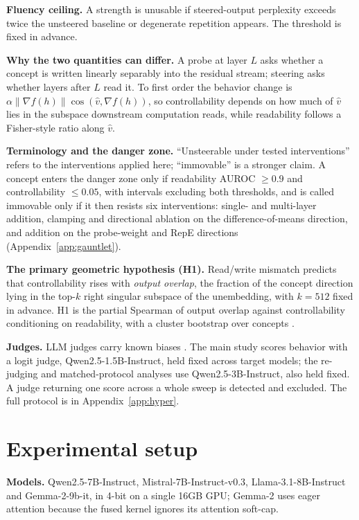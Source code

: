 \documentclass{article}
\begin{document}
\textbf{Fluency ceiling.} A strength is unusable if steered-output perplexity
exceeds twice the unsteered baseline or degenerate repetition appears. The
threshold is fixed in advance.

\textbf{Why the two quantities can differ.} A probe at layer $L$ asks whether a
concept is written linearly separably into the residual stream; steering asks
whether layers after $L$ read it. To first order the behavior change is
$\alpha \lVert \nabla f(h) \rVert \cos(\hat v, \nabla f(h))$, so controllability
depends on how much of $\hat v$ lies in the subspace downstream computation
reads, while readability follows a Fisher-style ratio along $\hat v$.

\textbf{Terminology and the danger zone.} ``Unsteerable under tested
interventions'' refers to the interventions applied here; ``immovable'' is a
stronger claim. A concept enters the danger zone only if readability AUROC
$\geq 0.9$ and controllability $\leq 0.05$, with intervals excluding both
thresholds, and is called immovable only if it then resists six interventions:
single- and multi-layer addition, clamping and directional ablation on the
difference-of-means direction, and addition on the probe-weight and RepE
directions (Appendix~\ref{app:gauntlet}).

\textbf{The primary geometric hypothesis (H1).} Read/write mismatch predicts that
controllability rises with \emph{output overlap}, the fraction of the concept
direction lying in the top-$k$ right singular subspace of the unembedding, with
$k=512$ fixed in advance. H1 is the partial Spearman of output overlap against
controllability conditioning on readability, with a cluster bootstrap over
concepts \citep{cameron2008bootstrap}.

\textbf{Judges.} LLM judges carry known biases \citep{zheng2023judge}. The main
study scores behavior with a logit judge, Qwen2.5-1.5B-Instruct, held fixed
across target models; the re-judging and matched-protocol analyses use
Qwen2.5-3B-Instruct, also held fixed. A judge returning one score across a whole
sweep is detected and excluded. The full protocol is in
Appendix~\ref{app:hyper}.

\section{Experimental setup}

\textbf{Models.} Qwen2.5-7B-Instruct, Mistral-7B-Instruct-v0.3,
Llama-3.1-8B-Instruct and Gemma-2-9b-it, in 4-bit on a single 16GB GPU; Gemma-2
uses eager attention because the fused kernel ignores its attention soft-cap.
\end{document}
